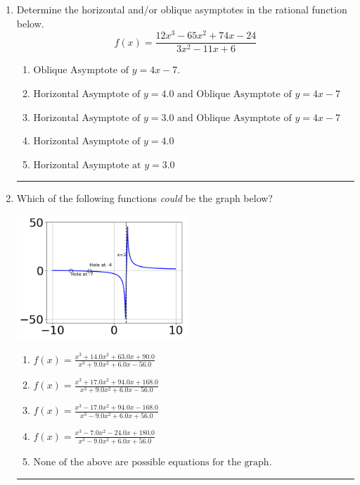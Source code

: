 \documentclass[14pt]{extbook}
\newcommand{\litem}[1]{\item#1\hspace*{-1cm}\rule{\textwidth}{0.4pt}}
\begin{document}
\begin{enumerate}
{\begin{enumerate}[label=\Alph*.]
\end{enumerate} }
\litem{
Determine the horizontal and/or oblique asymptotes in the rational function below.\[ f(x) = \frac{12x^{3} -65 x^{2} +74 x -24}{3x^{2} -11 x + 6} \]\begin{enumerate}[label=\Alph*.]
\item \( \text{Oblique Asymptote of } y = 4x -7. \)
\item \( \text{Horizontal Asymptote of } y = 4.0 \text{ and Oblique Asymptote of } y = 4x -7 \)
\item \( \text{Horizontal Asymptote of } y = 3.0 \text{ and Oblique Asymptote of } y = 4x -7 \)
\item \( \text{Horizontal Asymptote of } y = 4.0  \)
\item \( \text{Horizontal Asymptote at } y = 3.0 \)

\end{enumerate} }
\litem{
Which of the following functions \textit{could} be the graph below?
\begin{center}
    \includegraphics[width=0.5\textwidth]{../Figures/identifyGraphOfRationalFunctionA.png}
\end{center}
\begin{enumerate}[label=\Alph*.]
\item \( f(x)=\frac{x^{3} +14.0 x^{2} +63.0 x + 90.0}{x^{3} +9.0 x^{2} +6.0 x -56.0} \)
\item \( f(x)=\frac{x^{3} +17.0 x^{2} +94.0 x + 168.0}{x^{3} +9.0 x^{2} +6.0 x -56.0} \)
\item \( f(x)=\frac{x^{3} -17.0 x^{2} +94.0 x -168.0}{x^{3} -9.0 x^{2} +6.0 x + 56.0} \)
\item \( f(x)=\frac{x^{3} -7.0 x^{2} -24.0 x + 180.0}{x^{3} -9.0 x^{2} +6.0 x + 56.0} \)
\item \( \text{None of the above are possible equations for the graph.} \)


\end{enumerate}}
\end{enumerate}
\end{document}
